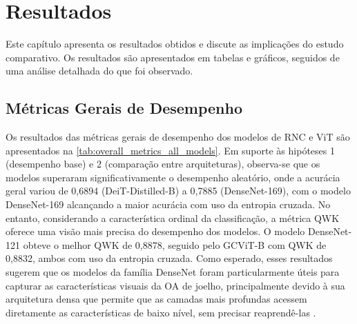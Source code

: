 \chapter{Resultados} \label{cap:resultados}

Este capítulo apresenta os resultados obtidos e discute as implicações do estudo comparativo. Os resultados são apresentados em tabelas e gráficos, seguidos de uma análise detalhada do que foi observado.

\section{Métricas Gerais de Desempenho}

Os resultados das métricas gerais de desempenho dos modelos de RNC e ViT são apresentados na \autoref{tab:overall_metrics_all_models}. Em suporte às hipóteses 1 (desempenho base) e 2 (comparação entre arquiteturas), observa-se que os modelos superaram significativamente o desempenho aleatório, onde a acurácia geral variou de 0,6894 (DeiT-Distilled-B) a 0,7885 (DenseNet-169), com o modelo DenseNet-169 alcançando a maior acurácia com uso da entropia cruzada. No entanto, considerando a característica ordinal da classificação, a métrica QWK oferece uma visão mais precisa do desempenho dos modelos. O modelo DenseNet-121 obteve o melhor QWK de 0,8878, seguido pelo GCViT-B com QWK de 0,8832, ambos com uso da entropia cruzada. Como esperado, esses resultados sugerem que os modelos da família DenseNet foram particularmente úteis para capturar as características visuais da OA de joelho, principalmente devido à sua arquitetura densa que permite que as camadas mais profundas acessem diretamente as características de baixo nível, sem precisar reaprendê-las \cite{Huang2017}.

